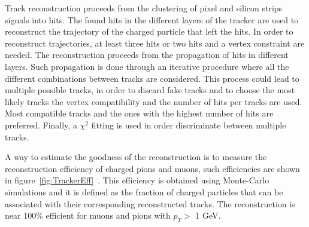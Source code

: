 Track reconstruction proceeds from the clustering of pixel and silicon strips signals into hits. The found hits in the different layers of the tracker are used to reconstruct the trajectory of the charged particle that left the hits. In order to reconstruct trajectories, at least three hits or two hits and a vertex constraint are needed. The reconstruction proceeds from the propagation of hits in different layers. Such propagation is done through an iterative procedure where all the different combinations between tracks are considered. This process could lead to multiple possible tracks, in order to discard fake tracks and to choose the most likely tracks the vertex compatibility and the number of hits per tracks are used. Most compatible tracks and the ones with the highest number of hits are preferred. Finally, a $\chi^{2}$ fitting is used in order discriminate between multiple tracks. 

A way to estimate the goodness of the reconstruction is to measure the reconstruction efficiency of charged pions and muons, such efficiencies are shown in figure~\ref{fig:TrackerEff}~\cite{Chatrchyan:2014fea}. This efficiency is obtained using Monte-Carlo simulations and it is defined as the fraction of charged particles that can be associated with their corresponding reconstructed tracks. The reconstruction is near 100\% efficient for muons and pions with $p_{T}>$ 1 GeV.

